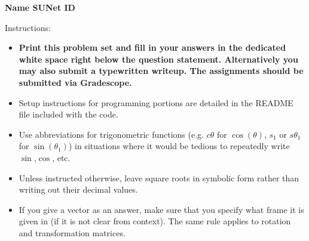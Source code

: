





{\bf Name \underline{\hspace{5cm}} }  \hspace{2cm}   {\bf SUNet ID \underline{\hspace{5cm}} }
\vspace{0cm}


\small

Instructions:
\begin{itemize}

\item {\bf Print this problem set and fill in your answers in the dedicated white space right below the question statement. Alternatively you may also submit a typewritten writeup. The assignments should be submitted via Gradescope.}

\item Setup instructions for programming portions are detailed in the README file included with the code.


\item Use abbreviations for trigonometric functions (e.g. $c\theta$ for $\cos(\theta)$,  
$s_1$ or $s\theta_1$ for $\sin(\theta_1)$) in situations where it would be tedious 
to repeatedly write $\sin$,$\cos$, etc.

\item Unless instructed otherwise, leave square roots in symbolic
form rather than writing out their decimal values.

\item If you give a vector as an answer, make sure that you specify
what frame it is given in (if it is not clear from context).  The same
rule applies to rotation and transformation matrices.

\end{itemize}
\vspace{1ex}

\normalsize

